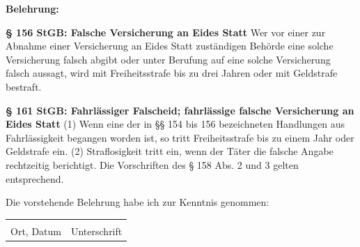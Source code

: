 \vfill
\small
\textbf{Belehrung:}

\footnotesize
\textbf{§ 156 StGB: Falsche Versicherung an Eides Statt} \newline
Wer vor einer zur Abnahme einer Versicherung an Eides Statt zuständigen Behörde eine solche Versicherung falsch abgibt oder unter Berufung auf eine solche Versicherung falsch aussagt, wird mit Freiheitsstrafe bis zu drei Jahren oder mit Geldstrafe bestraft. 

\textbf{§ 161 StGB: Fahrlässiger Falscheid; fahrlässige falsche Versicherung an Eides Statt} \newline
(1) Wenn eine der in §§ 154 bis 156 bezeichneten Handlungen aus Fahrlässigkeit begangen worden ist, so tritt Freiheitsstrafe bis zu einem Jahr oder Geldstrafe ein. \newline
(2) Straflosigkeit tritt ein, wenn der Täter die falsche Angabe rechtzeitig berichtigt. Die Vorschriften des § 158 Abs. 2 und 3 gelten entsprechend.

\normalsize
\vfill
Die vorstehende Belehrung habe ich zur Kenntnis genommen:

\hspace{-0.35cm}
\begin{tabular}{p{\TabLength}c}
	\underbar{Aachen, \varDate\hspace{\DateLength}}&\underbar{\hspace{4cm}}\\
	Ort, Datum&Unterschrift
\end{tabular}
\newpage
\thispagestyle{empty}